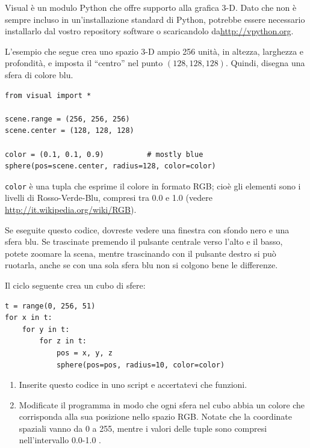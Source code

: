 \documentclass[10pt]{book}
\begin{document}
\vspace{0.2in}
\begin{exercise}

Visual è un modulo Python che offre supporto alla grafica 3-D. Dato che non è sempre incluso in un'installazione standard di Python, potrebbe essere necessario installarlo dal vostro repository software o scaricandolo da\url{http://vpython.org}.

L'esempio che segue crea uno spazio 3-D ampio 256 unità, in altezza, larghezza e profondità, e imposta il ``centro'' nel punto $(128,128,128)$.  Quindi, disegna una sfera di colore blu.

\begin{verbatim}
from visual import *

scene.range = (256, 256, 256)
scene.center = (128, 128, 128)

color = (0.1, 0.1, 0.9)          # mostly blue
sphere(pos=scene.center, radius=128, color=color)
\end{verbatim}

{\tt color} è una tupla che esprime il colore in formato RGB; cioè gli elementi sono i livelli di Rosso-Verde-Blu, compresi tra 0.0 e 1.0 (vedere
\url{http://it.wikipedia.org/wiki/RGB}).

Se eseguite questo codice, dovreste vedere una finestra con sfondo nero e una sfera blu. Se trascinate premendo il pulsante centrale verso l'alto e il basso, potete zoomare la scena, mentre trascinando con il pulsante destro si può ruotarla, anche se con una sola sfera blu non si colgono bene le differenze.

Il ciclo seguente crea un cubo di sfere:

\begin{verbatim}
t = range(0, 256, 51)
for x in t:
    for y in t:
        for z in t:
            pos = x, y, z
            sphere(pos=pos, radius=10, color=color)
\end{verbatim}

\begin{enumerate}

\item Inserite questo codice in uno script e accertatevi che funzioni.

\item Modificate il programma in modo che ogni sfera nel cubo abbia un colore che corrisponda alla sua posizione nello spazio RGB. Notate che la coordinate spaziali vanno da 0 a 255, mentre i valori delle tuple sono compresi nell'intervallo 0.0-1.0 .


\end{enumerate}
\end{exercise}
\end{document}
